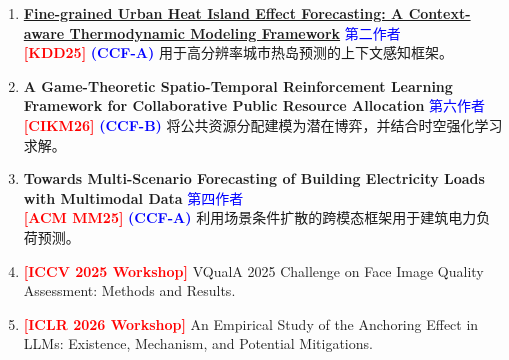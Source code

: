 \begin{enumerate}
\item {\footnotesize \textbf{\href{https://dl.acm.org/doi/abs/10.1145/3711896.3736962}{Fine-grained Urban Heat Island Effect Forecasting: A Context-aware Thermodynamic Modeling Framework}} \hfill \textcolor{blue}{第二作者}} \\
\textbf{\textcolor{red}{[KDD25]}} 
\textbf{\textcolor{blue}{(CCF-A)}}
用于高分辨率城市热岛预测的上下文感知框架。

\item {\footnotesize \textbf{A Game-Theoretic Spatio-Temporal Reinforcement Learning Framework for Collaborative Public Resource Allocation} \hfill \textcolor{blue}{第六作者}} \\
\textbf{\textcolor{red}{[CIKM26]}}
\textbf{\textcolor{blue}{(CCF-B)}}
将公共资源分配建模为潜在博弈，并结合时空强化学习求解。

\item \textbf{Towards Multi-Scenario Forecasting of Building Electricity Loads with Multimodal Data} \hfill \textcolor{blue}{第四作者} \\
\textbf{\textcolor{red}{[ACM MM25]}} 
\textbf{\textcolor{blue}{(CCF-A)}}
利用场景条件扩散的跨模态框架用于建筑电力负荷预测。

\item \textbf{\textcolor{red}{[ICCV 2025 Workshop]}} VQualA 2025 Challenge on Face Image Quality Assessment: Methods and Results. \hfill
\item \textbf{\textcolor{red}{[ICLR 2026 Workshop]}} An Empirical Study of the Anchoring Effect in LLMs: Existence, Mechanism, and Potential Mitigations.\hfill
\end{enumerate}
